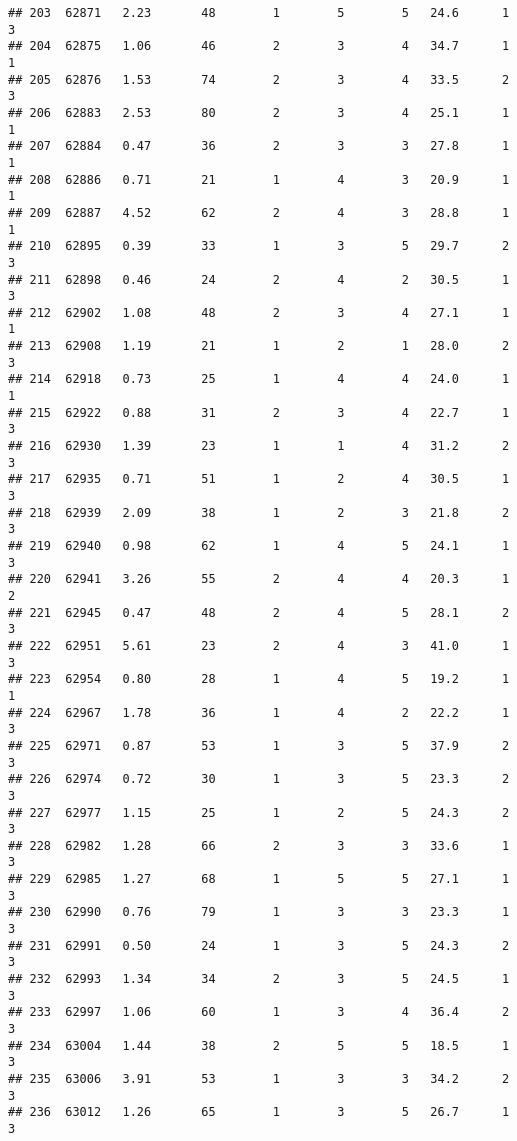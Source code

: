 \documentclass[
]{article}
\begin{document}
\begin{verbatim}
## 203  62871   2.23       48        1        5        5   24.6      1      3
## 204  62875   1.06       46        2        3        4   34.7      1      1
## 205  62876   1.53       74        2        3        4   33.5      2      3
## 206  62883   2.53       80        2        3        4   25.1      1      1
## 207  62884   0.47       36        2        3        3   27.8      1      1
## 208  62886   0.71       21        1        4        3   20.9      1      1
## 209  62887   4.52       62        2        4        3   28.8      1      1
## 210  62895   0.39       33        1        3        5   29.7      2      3
## 211  62898   0.46       24        2        4        2   30.5      1      3
## 212  62902   1.08       48        2        3        4   27.1      1      1
## 213  62908   1.19       21        1        2        1   28.0      2      3
## 214  62918   0.73       25        1        4        4   24.0      1      1
## 215  62922   0.88       31        2        3        4   22.7      1      3
## 216  62930   1.39       23        1        1        4   31.2      2      3
## 217  62935   0.71       51        1        2        4   30.5      1      3
## 218  62939   2.09       38        1        2        3   21.8      2      3
## 219  62940   0.98       62        1        4        5   24.1      1      3
## 220  62941   3.26       55        2        4        4   20.3      1      2
## 221  62945   0.47       48        2        4        5   28.1      2      3
## 222  62951   5.61       23        2        4        3   41.0      1      3
## 223  62954   0.80       28        1        4        5   19.2      1      1
## 224  62967   1.78       36        1        4        2   22.2      1      3
## 225  62971   0.87       53        1        3        5   37.9      2      3
## 226  62974   0.72       30        1        3        5   23.3      2      3
## 227  62977   1.15       25        1        2        5   24.3      2      3
## 228  62982   1.28       66        2        3        3   33.6      1      3
## 229  62985   1.27       68        1        5        5   27.1      1      3
## 230  62990   0.76       79        1        3        3   23.3      1      3
## 231  62991   0.50       24        1        3        5   24.3      2      3
## 232  62993   1.34       34        2        3        5   24.5      1      3
## 233  62997   1.06       60        1        3        4   36.4      2      3
## 234  63004   1.44       38        2        5        5   18.5      1      3
## 235  63006   3.91       53        1        3        3   34.2      2      3
## 236  63012   1.26       65        1        3        5   26.7      1      3

\end{verbatim}
\end{document}
